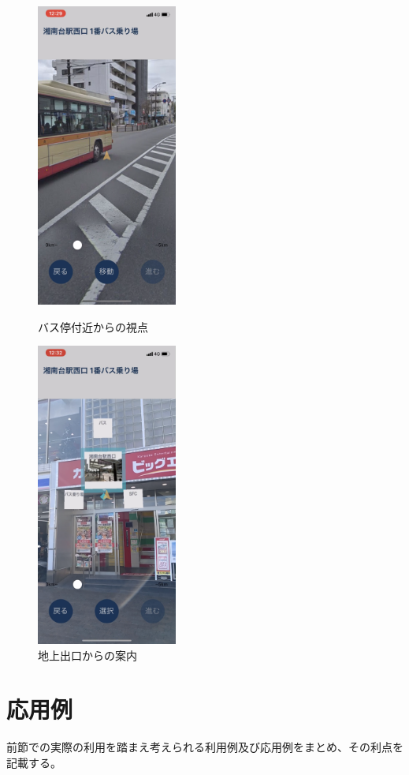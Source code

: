 \begin{figure}[H]
  \begin{minipage}{0.5\hsize}
    \centering
    \includegraphics[height=100mm]{images/shonandai_bus_moved.png}
    \caption{バス停付近からの視点} \label{fig:shonandai_bus_moved}
  \end{minipage}
  \begin{minipage}{0.5\hsize}
    \centering
    \includegraphics[height=100mm]{images/shonandai_bus2.png}
    \caption{地上出口からの案内} \label{fig:shonandai_bus2}
  \end{minipage}
\end{figure}


\section{応用例}
前節での実際の利用を踏まえ考えられる利用例及び応用例をまとめ、その利点を記載する。

